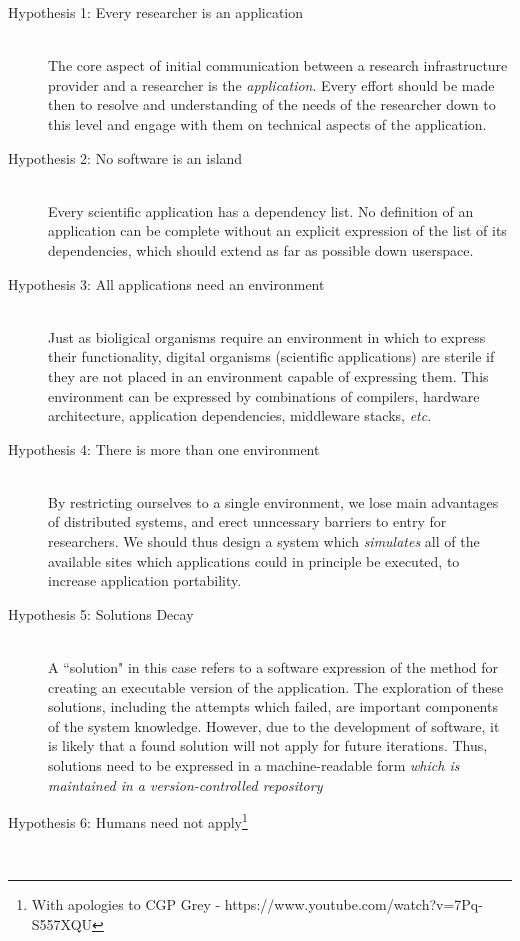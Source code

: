 \documentclass[a4paper]{jpconf}
\begin{document}
	\begin{description}
		\item[Hypothesis 1: Every researcher is an application] \hfill \\
		The core aspect of initial communication between a research infrastructure provider and a researcher is the {\it application}. Every effort should be made then to resolve and understanding of the needs of the researcher down to this level and engage with them on technical aspects of the application.
		\item[Hypothesis 2: No software is an island] \hfill \\
		Every scientific application has a dependency list. No definition of an application can be complete without an explicit expression of the list of its dependencies, which should extend as far as possible down userspace.
		\item[Hypothesis 3: All applications need an environment] \hfill \\
		Just as bioligical organisms require an environment in which to express their functionality, digital organisms (scientific applications) are sterile if they are not placed in an environment capable of expressing them. This environment can be expressed by combinations of compilers, hardware architecture, application dependencies, middleware stacks, {\it etc}.
		\item[Hypothesis 4: There is more than one environment] \hfill \\
		By restricting ourselves to a single environment, we lose main advantages of distributed systems, and erect unncessary barriers to entry for researchers. We should thus design a system which {\it simulates} all of the available sites which applications could in principle be executed, to increase application portability.
		\item[Hypothesis 5: Solutions Decay] \hfill \\
		A ``solution" in this case refers to a software expression of the method for creating an executable version of the application. The exploration of these solutions, including the attempts which failed, are important components of the system knowledge. However, due to the development of software, it is likely that a found solution will not apply for future iterations. Thus, solutions need to be expressed in a machine-readable form {\it which is maintained in a version-controlled repository}
		\item[Hypothesis 6: Humans need not apply\footnote{With apologies to CGP Grey - https://www.youtube.com/watch?v=7Pq-S557XQU}] \hfill \\

\end{description}
\end{document}
